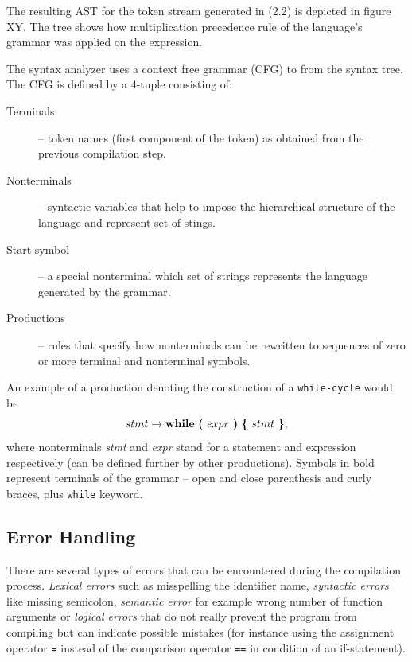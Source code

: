 \documentclass[
  digital, %
  table,   %
  lof,     %
  lot,     %
  oneside,
]{fithesis3}
\begin{document}
The resulting AST for the token stream generated in (2.2) is depicted in figure XY. The tree shows how multiplication precedence rule of the language's grammar was applied on the expression.
\begin{center}
\end{center}
The syntax analyzer uses a context free grammar (CFG) to from the syntax tree. The CFG is defined by a 4-tuple consisting of:
\begin{description}
  \item[Terminals] -- token names (first component of the token) as obtained from the previous compilation step.
  \item[Nonterminals] -- syntactic variables that help to impose the hierarchical structure of the language and represent set of stings.
  \item[Start symbol] -- a special nonterminal which set of strings represents the language generated by the grammar.
  \item[Productions] -- rules that specify how nonterminals can be rewritten to sequences of zero or more terminal and nonterminal symbols. 
\end{description}

An example of a production denoting the construction of a \texttt{while-cycle} would be
\begin{equation}
  stmt 
  \rightarrow 
  \textbf{while}\ 
  \textbf{(}\ expr\ \textbf{)}\ 
  \textbf{\{}\ stmt\ \textbf{\}} 
  \textnormal{,}
\end{equation}
\noindent
where nonterminals \textit{stmt} and \textit{expr} stand for a statement and expression respectively (can be defined further by other productions). Symbols in bold represent terminals of the grammar -- open and close parenthesis and curly braces, plus \texttt{while} keyword.

  \subsection{Error Handling}
There are several types of errors that can be encountered during the compilation process. \textit{Lexical errors} such as misspelling the identifier name, \textit{syntactic errors} like missing semicolon, \textit{semantic error} for example wrong number of function arguments or \textit{logical errors} that do not really prevent the program from compiling but can indicate possible mistakes (for instance using the assignment operator \texttt{=} instead of the comparison operator \texttt{==} in condition of an if-statement).
\end{document}
